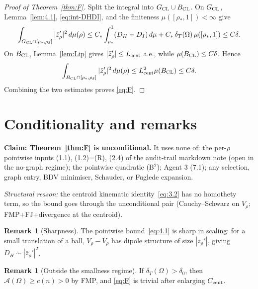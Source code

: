 \documentclass[11pt]{article}
\theoremstyle{definition}
\newtheorem{remark}[theorem]{Remark}
\newcommand{\Om}{\Omega}
\newcommand{\rstar}{\rho_{*}}
\begin{document}
\begin{proof}[Proof of Theorem~\ref{thm:F}]
Split the integral into \(G_{\rm CL}\cup B_{\rm CL}\). On \(G_{\rm CL}\),
Lemma~\ref{lem:4.1}, \eqref{eq:int-DHDI}, and the finiteness
$\mu([\rstar,1])<\infty$ give
\[
   \int_{G_{\rm CL}\cap[\rstar,\rho_\delta]}
      |\bar z_\rho'|^2\,d\mu(\rho)
   \le C_*\int_{\rstar}^{1}(D_H+D_I)\,d\mu
       + C_*\,\delta_T(\Om)\,\mu([\rstar,1])
   \le C\delta.
\]
On \(B_{\rm CL}\), Lemma~\ref{lem:Lip} gives
\(|\bar z_\rho'|\le L_{\rm cent}\) a.e., while
\(\mu(B_{\rm CL})\le C\delta\). Hence
\[
   \int_{B_{\rm CL}\cap[\rstar,\rho_\delta]}
      |\bar z_\rho'|^2\,d\mu(\rho)
   \le L_{\rm cent}^2\mu(B_{\rm CL})\le C\delta.
\]
Combining the two estimates proves \eqref{eq:F}.\qedhere
\end{proof}

\section{Conditionality and remarks}\label{sec:conditionality}

\textbf{Claim: Theorem~\ref{thm:F} is unconditional.} It uses none of:
the per-$\rho$ pointwise inputs (1.1), (1.2)=(R), (2.4)
of the audit-trail markdown note (open in the no-graph regime);
the pointwise quadratic (B$^2$); Agent 3 (7.1); any
selection, graph entry, BDV minimiser, Schauder, or Fuglede expansion.

\emph{Structural reason:} the centroid kinematic identity~\eqref{eq:3.2}
has no homothety term, so the bound goes through the unconditional pair
(Cauchy--Schwarz on $V_\rho$; FMP+FJ+divergence at the centroid).

\begin{remark}[Sharpness]
The pointwise bound~\eqref{eq:4.1} is sharp in scaling: for a small
translation of a ball, $V_\rho-\bar V_\rho$ has dipole structure of
size $|\bar z_\rho'|$, giving $D_H\sim|\bar z_\rho'|^2$.
\end{remark}

\begin{remark}[Outside the smallness regime]
If $\delta_T(\Om)>\delta_0$, then $\mathcal A(\Om)\ge c(n)>0$ by FMP,
and \eqref{eq:F} is trivial after enlarging $C_{\rm cent}$.
\end{remark}
\end{document}
